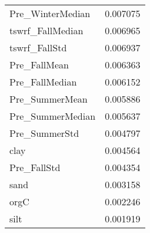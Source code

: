 \begin{tabular}{lr}
Pre_WinterMedian & 0.007075 \\
tswrf_FallMedian & 0.006965 \\
tswrf_FallStd & 0.006937 \\
Pre_FallMean & 0.006363 \\
Pre_FallMedian & 0.006152 \\
Pre_SummerMean & 0.005886 \\
Pre_SummerMedian & 0.005637 \\
Pre_SummerStd & 0.004797 \\
clay & 0.004564 \\
Pre_FallStd & 0.004354 \\
sand & 0.003158 \\
orgC & 0.002246 \\
silt & 0.001919 \\
\bottomrule
\end{tabular}
